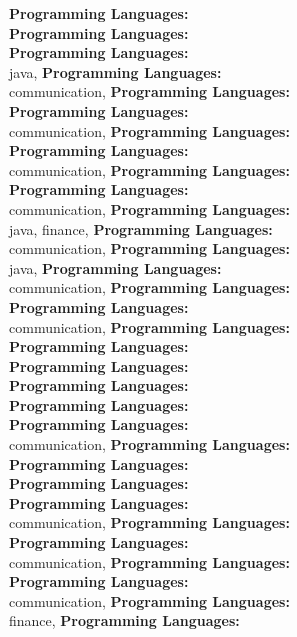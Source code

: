 \textbf{Programming Languages:} \\
\textbf{Programming Languages:} \\
\textbf{Programming Languages:} \\
java, \textbf{Programming Languages:} \\
communication, \textbf{Programming Languages:} \\
\textbf{Programming Languages:} \\
communication, \textbf{Programming Languages:} \\
\textbf{Programming Languages:} \\
communication, \textbf{Programming Languages:} \\
\textbf{Programming Languages:} \\
communication, \textbf{Programming Languages:} \\
java, finance, \textbf{Programming Languages:} \\
communication, \textbf{Programming Languages:} \\
java, \textbf{Programming Languages:} \\
communication, \textbf{Programming Languages:} \\
\textbf{Programming Languages:} \\
communication, \textbf{Programming Languages:} \\
\textbf{Programming Languages:} \\
\textbf{Programming Languages:} \\
\textbf{Programming Languages:} \\
\textbf{Programming Languages:} \\
\textbf{Programming Languages:} \\
communication, \textbf{Programming Languages:} \\
\textbf{Programming Languages:} \\
\textbf{Programming Languages:} \\
\textbf{Programming Languages:} \\
communication, \textbf{Programming Languages:} \\
\textbf{Programming Languages:} \\
communication, \textbf{Programming Languages:} \\
\textbf{Programming Languages:} \\
communication, \textbf{Programming Languages:} \\
finance, \textbf{Programming Languages:} \\

